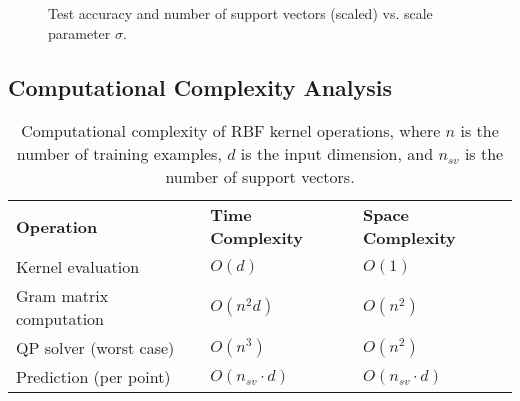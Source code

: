 \documentclass[11pt]{article}
\begin{document}
\begin{figure}[h]
\centering
{}
\caption{Test accuracy and number of support vectors (scaled) vs. scale parameter $\sigma$.}
\end{figure}

\subsection{Computational Complexity Analysis}
\begin{table}[h]
  \centering
  \begin{tabular}{lll}
    \textbf{Operation} & \textbf{Time Complexity} & \textbf{Space Complexity} \\
    Kernel evaluation & $O(d)$ & $O(1)$ \\
    Gram matrix computation & $O(n^2d)$ & $O(n^2)$ \\
    QP solver (worst case) & $O(n^3)$ & $O(n^2)$ \\
    Prediction (per point) & $O(n_{sv} \cdot d)$ & $O(n_{sv} \cdot d)$ \\
  \end{tabular}
  \caption{Computational complexity of RBF kernel operations, where $n$ is the number of training examples, $d$ is the input dimension, and $n_{sv}$ is the number of support vectors.}
\end{table}
\end{document}
